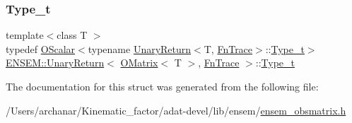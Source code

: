 \mbox{\label{structENSEM_1_1UnaryReturn_3_01OMatrix_3_01T_01_4_00_01FnTrace_01_4_a3a513c4d3321678f089c292ce4a36fe9}} 
\subsubsection{\texorpdfstring{Type\_t}{Type\_t}\hspace{0.1cm}{\footnotesize\ttfamily [3/3]}}
{\footnotesize\ttfamily template$<$class T $>$ \\
typedef \mbox{\hyperlink{classENSEM_1_1OScalar}{O\+Scalar}}$<$typename \mbox{\hyperlink{structENSEM_1_1UnaryReturn}{Unary\+Return}}$<$T, \mbox{\hyperlink{structENSEM_1_1FnTrace}{Fn\+Trace}}$>$\+::\mbox{\hyperlink{structENSEM_1_1UnaryReturn_3_01OMatrix_3_01T_01_4_00_01FnTrace_01_4_a3a513c4d3321678f089c292ce4a36fe9}{Type\+\_\+t}}$>$ \mbox{\hyperlink{structENSEM_1_1UnaryReturn}{E\+N\+S\+E\+M\+::\+Unary\+Return}}$<$ \mbox{\hyperlink{classENSEM_1_1OMatrix}{O\+Matrix}}$<$ T $>$, \mbox{\hyperlink{structENSEM_1_1FnTrace}{Fn\+Trace}} $>$\+::\mbox{\hyperlink{structENSEM_1_1UnaryReturn_3_01OMatrix_3_01T_01_4_00_01FnTrace_01_4_a3a513c4d3321678f089c292ce4a36fe9}{Type\+\_\+t}}}



The documentation for this struct was generated from the following file\+:\begin{DoxyCompactItemize}
\item 
/\+Users/archanar/\+Kinematic\+\_\+factor/adat-\/devel/lib/ensem/\mbox{\hyperlink{adat-devel_2lib_2ensem_2ensem__obsmatrix_8h}{ensem\+\_\+obsmatrix.\+h}}\end{DoxyCompactItemize}
